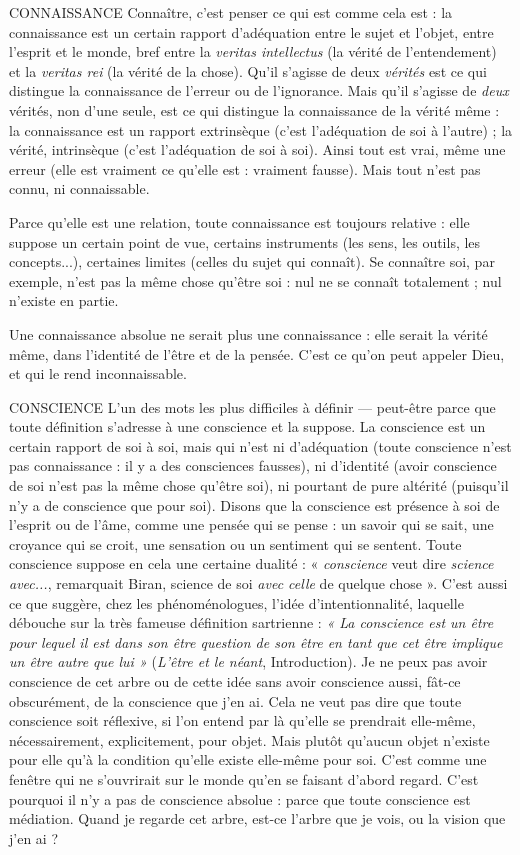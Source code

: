 CONNAISSANCE Connaître, c’est penser ce qui est comme cela est : la
connaissance est un certain rapport d’adéquation entre
le sujet et l’objet, entre l'esprit et le monde, bref entre la {\it veritas intellectus} (la
vérité de l’entendement) et la {\it veritas rei} (la vérité de la chose). Qu'il s'agisse de
deux {\it vérités} est ce qui distingue la connaissance de l’erreur ou de l'ignorance.
Mais qu'il s'agisse de {\it deux} vérités, non d’une seule, est ce qui distingue la
connaissance de la vérité même : la connaissance est un rapport extrinsèque
(c’est l’adéquation de soi à l’autre) ; la vérité, intrinsèque (c’est l’adéquation de
soi à soi). Ainsi tout est vrai, même une erreur (elle est vraiment ce qu’elle est :
vraiment fausse). Mais tout n’est pas connu, ni connaissable.

Parce qu’elle est une relation, toute connaissance est toujours relative : elle
suppose un certain point de vue, certains instruments (les sens, les outils, les
concepts...), certaines limites (celles du sujet qui connaît). Se connaître soi, par
exemple, n’est pas la même chose qu'être soi : nul ne se connaît totalement ;
nul n'existe en partie.

Une connaissance absolue ne serait plus une connaissance : elle serait la
vérité même, dans l'identité de l’être et de la pensée. C’est ce qu’on peut
appeler Dieu, et qui le rend inconnaissable.

CONSCIENCE  L’un des mots les plus difficiles à définir — peut-être parce
que toute définition s'adresse à une conscience et la suppose.
La conscience est un certain rapport de soi à soi, mais qui n’est ni d’adéquation
(toute conscience n’est pas connaissance : il y a des consciences fausses), ni
d'identité (avoir conscience de soi n’est pas la même chose qu'être soi), ni pourtant
de pure altérité (puisqu'il n’y a de conscience que pour soi). Disons que la
conscience est présence à soi de l'esprit ou de l’âme, comme une pensée qui se
pense : un savoir qui se sait, une croyance qui se croit, une sensation ou un sentiment
qui se sentent. Toute conscience suppose en cela une certaine dualité :
« {\it conscience} veut dire {\it science avec...}, remarquait Biran, science de soi {\it avec celle}
de quelque chose ». C’est aussi ce que suggère, chez les phénoménologues,
l’idée d’intentionnalité, laquelle débouche sur la très fameuse définition
sartrienne : {\it « La conscience est un être pour lequel il est dans son être question de
son être en tant que cet être implique un être autre que lui »} ({\it L'être et le néant},
Introduction). Je ne peux pas avoir conscience de cet arbre ou de cette idée sans
avoir conscience aussi, fât-ce obscurément, de la conscience que j’en ai. Cela ne
veut pas dire que toute conscience soit réflexive, si l’on entend par là qu’elle se
prendrait elle-même, nécessairement, explicitement, pour objet. Mais plutôt
qu'aucun objet n’existe pour elle qu’à la condition qu’elle existe elle-même
pour soi. C’est comme une fenêtre qui ne s’ouvrirait sur le monde qu’en se faisant
d’abord regard. C’est pourquoi il n’y a pas de conscience absolue : parce
que toute conscience est médiation. Quand je regarde cet arbre, est-ce l’arbre
que je vois, ou la vision que j’en ai ?

